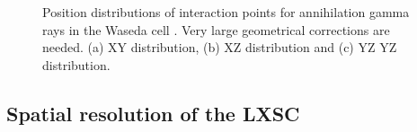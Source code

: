 \begin{figure}[!htb]
	\centering
	\caption{\label{fig.wasedaGeo} Position distributions of interaction points for annihilation gamma rays in the Waseda cell \cite{nishikido05}. Very large geometrical corrections are needed. (a) XY distribution, (b) XZ distribution and (c) YZ YZ distribution.}
\end{figure}

\subsection{Spatial resolution of the LXSC}
\label{sec.spatial}

